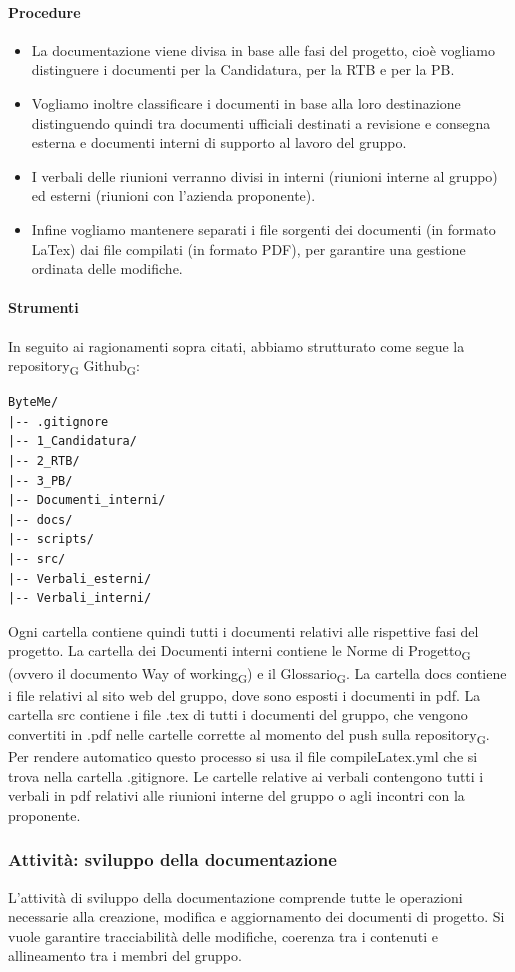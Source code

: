 \documentclass[11pt,a4paper]{article}
\newcommand{\gls}[1]{#1\textsubscript{G}}
\begin{document}
\paragraph{Procedure}
\begin{itemize}
    \item La documentazione viene divisa in base alle fasi del progetto, cioè vogliamo distinguere i documenti per la Candidatura, per la RTB e per la PB.
    \item Vogliamo inoltre classificare i documenti in base alla loro destinazione distinguendo quindi tra documenti ufficiali destinati a revisione e consegna esterna e documenti interni di supporto al lavoro del gruppo.
    \item I verbali delle riunioni verranno divisi in interni (riunioni interne al gruppo) ed esterni (riunioni con l'azienda proponente).
    \item Infine vogliamo mantenere separati i file sorgenti dei documenti (in formato LaTex) dai file compilati (in formato PDF), per garantire una gestione ordinata delle modifiche.
\end{itemize}

\paragraph{Strumenti}
In seguito ai ragionamenti sopra citati, abbiamo strutturato come segue la \gls{repository} \gls{Github}:
\begin{verbatim}
ByteMe/
|-- .gitignore
|-- 1_Candidatura/
|-- 2_RTB/
|-- 3_PB/
|-- Documenti_interni/
|-- docs/
|-- scripts/
|-- src/
|-- Verbali_esterni/
|-- Verbali_interni/
\end{verbatim}

Ogni cartella contiene quindi tutti i documenti relativi alle rispettive fasi del progetto.
La cartella dei Documenti interni contiene le \gls{Norme di Progetto} (ovvero il documento \gls{Way of working}) e il \gls{Glossario}.
La cartella docs contiene i file relativi al sito web del gruppo, dove sono esposti i documenti in pdf.
La cartella src contiene i file .tex di tutti i documenti del gruppo, che vengono convertiti in .pdf nelle cartelle corrette al momento del push sulla \gls{repository}. Per rendere automatico questo processo si usa il file compileLatex.yml che si trova nella cartella .gitignore.
Le cartelle relative ai verbali contengono tutti i verbali in pdf relativi alle riunioni interne del gruppo o agli incontri con la proponente.

\subsubsection{Attività: sviluppo della documentazione}
L’attività di sviluppo della documentazione comprende tutte le operazioni necessarie alla creazione, modifica e aggiornamento dei documenti di progetto.
Si vuole garantire tracciabilità delle modifiche, coerenza tra i contenuti e allineamento tra i membri del gruppo.
\end{document}
